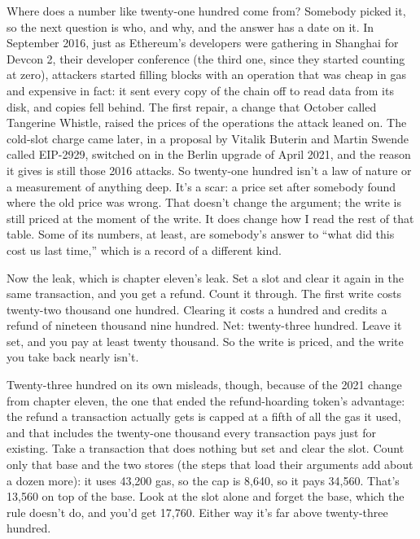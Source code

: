 \documentclass[11pt,twoside]{article}
\theoremstyle{thielethm}
\theoremstyle{thieledef}
\theoremstyle{thieledef}
\theoremstyle{thieledef}
\theoremstyle{thielethm}
\theoremstyle{thieleobs}
\theoremstyle{thielethm}
\begin{document}
Where does a number like twenty-one hundred come from? Somebody picked it, so the next question is who, and why, and the answer has a date on it. In September 2016, just as Ethereum's developers were gathering in Shanghai for Devcon 2, their developer conference (the third one, since they started counting at zero), attackers started filling blocks with an operation that was cheap in gas and expensive in fact: it sent every copy of the chain off to read data from its disk, and copies fell behind. The first repair, a change that October called Tangerine Whistle, raised the prices of the operations the attack leaned on. The cold-slot charge came later, in a proposal by Vitalik Buterin and Martin Swende called EIP-2929, switched on in the Berlin upgrade of April 2021, and the reason it gives is still those 2016 attacks. So twenty-one hundred isn't a law of nature or a measurement of anything deep. It's a scar: a price set after somebody found where the old price was wrong. That doesn't change the argument; the write is still priced at the moment of the write. It does change how I read the rest of that table. Some of its numbers, at least, are somebody's answer to ``what did this cost us last time,'' which is a record of a different kind.

Now the leak, which is chapter eleven's leak. Set a slot and clear it again in the same transaction, and you get a refund. Count it through. The first write costs twenty-two thousand one hundred. Clearing it costs a hundred and credits a refund of nineteen thousand nine hundred. Net: twenty-three hundred. Leave it set, and you pay at least twenty thousand. So the write is priced, and the write you take back nearly isn't.

Twenty-three hundred on its own misleads, though, because of the 2021 change from chapter eleven, the one that ended the refund-hoarding token's advantage: the refund a transaction actually gets is capped at a fifth of all the gas it used, and that includes the twenty-one thousand every transaction pays just for existing. Take a transaction that does nothing but set and clear the slot. Count only that base and the two stores (the steps that load their arguments add about a dozen more): it uses 43,200 gas, so the cap is 8,640, so it pays 34,560. That's 13,560 on top of the base. Look at the slot alone and forget the base, which the rule doesn't do, and you'd get 17,760. Either way it's far above twenty-three hundred.
\end{document}
